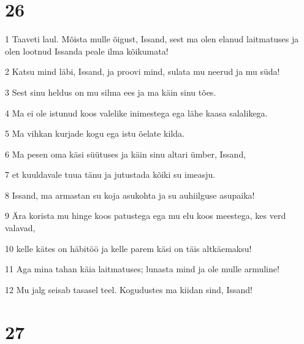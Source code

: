 \chapter{26}

\par 1 Taaveti laul. Mõista mulle õigust, Issand, sest ma olen elanud laitmatuses ja olen lootnud Issanda peale ilma kõikumata!
\par 2 Katsu mind läbi, Issand, ja proovi mind, sulata mu neerud ja mu süda!
\par 3 Sest sinu heldus on mu silma ees ja ma käin sinu tões.
\par 4 Ma ei ole istunud koos valelike inimestega ega lähe kaasa salalikega.
\par 5 Ma vihkan kurjade kogu ega istu õelate kilda.
\par 6 Ma pesen oma käsi süütuses ja käin sinu altari ümber, Issand,
\par 7 et kuuldavale tuua tänu ja jutustada kõiki su imeasju.
\par 8 Issand, ma armastan su koja asukohta ja su auhiilguse asupaika!
\par 9 Ära korista mu hinge koos patustega ega mu elu koos meestega, kes verd valavad,
\par 10 kelle kätes on häbitöö ja kelle parem käsi on täis altkäemaksu!
\par 11 Aga mina tahan käia laitmatuses; lunasta mind ja ole mulle armuline!
\par 12 Mu jalg seisab tasasel teel. Kogudustes ma kiidan sind, Issand!

\chapter{27}


